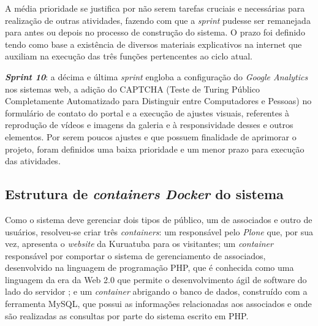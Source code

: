 A média prioridade se justifica por não serem tarefas cruciais e necessárias para realização de outras atividades, fazendo com que a \textit{sprint} pudesse ser remanejada para antes ou depois no processo de construção do sistema. O prazo foi definido tendo como base a existência de diversos materiais explicativos na internet que auxiliam na execução das três funções pertencentes ao ciclo atual.


\textbf{\textit{Sprint 10}}: a décima e última \textit{sprint} engloba a configuração do \textit{Google Analytics} nos sistemas web, a adição do CAPTCHA (Teste de Turing Público Completamente Automatizado para Distinguir entre Computadores e Pessoas) no formulário de contato do portal e a execução de ajustes visuais, referentes à reprodução de vídeos e imagens da galeria e à responsividade desses e outros elementos. Por serem poucos ajustes e que possuem finalidade de aprimorar o projeto, foram definidos uma baixa prioridade e um menor prazo para execução das atividades. 






\hspace{2.5cm}
\subsection{Estrutura de \textit{containers Docker} do sistema}
\label{subsec:docker}
\hspace{2.5cm}

Como o sistema deve gerenciar dois tipos de público, um de associados e outro de usuários, resolveu-se criar três \textit{containers}: um responsável pelo \textit{Plone} que, por sua vez, apresenta o \textit{website} da Kuruatuba para os visitantes; um \textit{container} responsável por comportar o sistema de gerenciamento de associados, desenvolvido na linguagem de programação PHP, que é conhecida como uma linguagem da era da Web 2.0 que permite o desenvolvimento ágil de software do lado do servidor \cite{suzumura2008performance}; e um \textit{container} abrigando o banco de dados, construído com a ferramenta MySQL, que possui as informações relacionadas aos associados e onde são realizadas as consultas por parte do sistema escrito em PHP.

